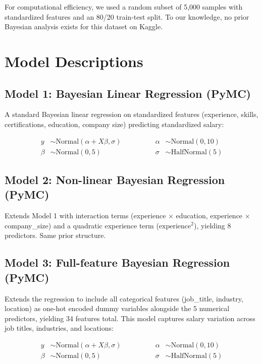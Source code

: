 \documentclass[11pt,a4paper]{article}
\begin{document}
For computational efficiency, we used a random subset of 5,000 samples with standardized features and an 80/20 train-test split. To our knowledge, no prior Bayesian analysis exists for this dataset on Kaggle.

\section{Model Descriptions}

\subsection{Model 1: Bayesian Linear Regression (PyMC)}
A standard Bayesian linear regression on standardized features (experience, skills, certifications, education, company size) predicting standardized salary:

\[
\begin{aligned}
y      &\sim \text{Normal}(\alpha + X\beta, \sigma) \qquad\qquad & \alpha &\sim \text{Normal}(0, 10) \\
\beta  &\sim \text{Normal}(0, 5) \qquad\qquad & \sigma &\sim \text{HalfNormal}(5)
\end{aligned}
\]

\subsection{Model 2: Non-linear Bayesian Regression (PyMC)}
Extends Model 1 with interaction terms (experience $\times$ education, experience $\times$ company\_size) and a quadratic experience term ($\text{experience}^2$), yielding 8 predictors. Same prior structure.

\subsection{Model 3: Full-feature Bayesian Regression (PyMC)}
Extends the regression to include all categorical features (job\_title, industry, location) as one-hot encoded dummy variables alongside the 5 numerical predictors, yielding 34 features total. This model captures salary variation across job titles, industries, and locations:


\[
\begin{aligned}
y      &\sim \text{Normal}(\alpha + X\beta, \sigma) \qquad\qquad & \alpha &\sim \text{Normal}(0, 10) \\
\beta  &\sim \text{Normal}(0, 5) \qquad\qquad & \sigma &\sim \text{HalfNormal}(5)
\end{aligned}
\]
\end{document}
